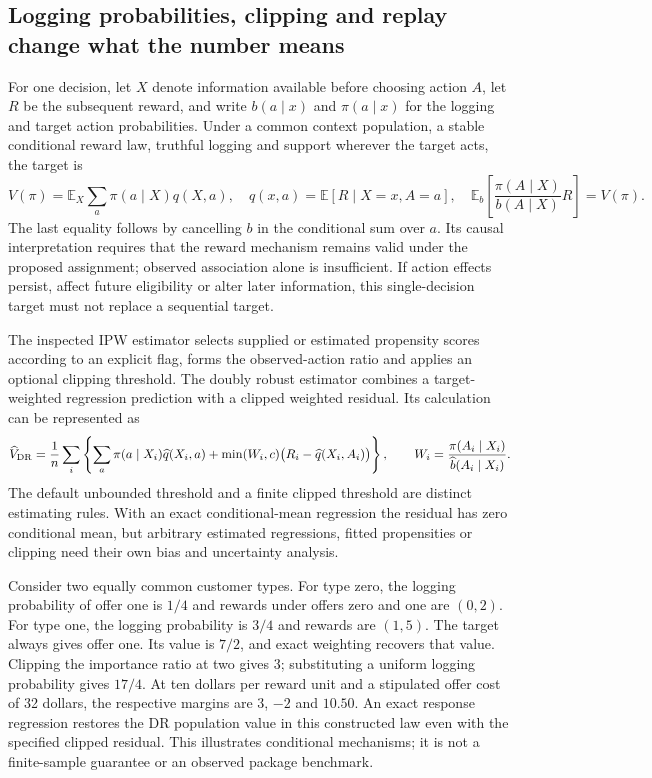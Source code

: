 \subsection{Logging probabilities, clipping and replay change what the number means}
\label{exec23:obp-target}
For one decision, let $X$ denote information available before choosing action
$A$, let $R$ be the subsequent reward, and write $b(a\mid x)$ and
$\pi(a\mid x)$ for the logging and target action probabilities. Under a common
context population, a stable conditional reward law, truthful logging and
support wherever the target acts, the target is
\[
 V(\pi)=\mathbb E_X\sum_a\pi(a\mid X)q(X,a),
 \quad q(x,a)=\mathbb E[R\mid X=x,A=a],
 \quad \mathbb E_b\!\left[\frac{\pi(A\mid X)}{b(A\mid X)}R\right]=V(\pi).
\]
The last equality follows by cancelling $b$ in the conditional sum over $a$.
Its causal interpretation requires that the reward mechanism remains valid
under the proposed assignment; observed association alone is insufficient.
If action effects persist, affect future eligibility or alter later information,
this single-decision target must not replace a sequential target.

The inspected IPW estimator selects supplied or estimated propensity scores
according to an explicit flag, forms the observed-action ratio and applies an
optional clipping threshold. The doubly robust estimator combines a
target-weighted regression prediction with a clipped weighted residual. Its
calculation can be represented as
\[
 \widehat V_{\rm DR}=\frac1n\sum_i\left\{
 \sum_a\pi(a\mid X_i)\widehat q(X_i,a)
 +\min(W_i,c)\big(R_i-\widehat q(X_i,A_i)\big)\right\},
 \qquad W_i=\frac{\pi(A_i\mid X_i)}{\widehat b(A_i\mid X_i)}.
\]
The default unbounded threshold and a finite clipped threshold are distinct
estimating rules. With an exact conditional-mean regression the residual has
zero conditional mean, but arbitrary estimated regressions, fitted propensities
or clipping need their own bias and uncertainty analysis.
\cite{exec23_obp_sources}

Consider two equally common customer types. For type zero, the logging
probability of offer one is $1/4$ and rewards under offers zero and one are
$(0,2)$. For type one, the logging probability is $3/4$ and rewards are $(1,5)$.
The target always gives offer one. Its value is $7/2$, and exact weighting
recovers that value. Clipping the importance ratio at two gives $3$; substituting
a uniform logging probability gives $17/4$. At ten dollars per reward unit and
a stipulated offer cost of 32 dollars, the respective margins are $3$, $-2$ and
$10.50$. An exact response regression restores the DR population value in this
constructed law even with the specified clipped residual. This illustrates
conditional mechanisms; it is not a finite-sample guarantee or an observed
package benchmark. \cite{exec23_obp_reference}

